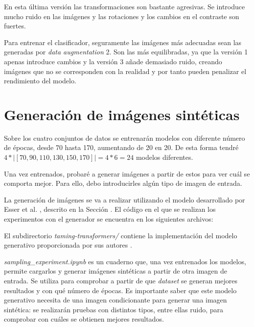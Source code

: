 En esta última versión las transformaciones son bastante agresivas. Se introduce mucho ruido en las imágenes y las rotaciones y los cambios en el contraste son fuertes.

Para entrenar el clasificador, seguramente las imágenes más adecuadas sean las generadas por \textit{data augmentation} 2. Son las más equilibradas, ya que la versión 1 apenas introduce cambios y la versión 3 añade demasiado ruido, creando imágenes que no se corresponden con la realidad y por tanto pueden penalizar el rendimiento del modelo.

\newpage
\section{Generación de imágenes sintéticas}

Sobre los cuatro conjuntos de datos se entrenarán modelos con diferente número de épocas, desde 70 hasta 170, aumentando de 20 en 20. De esta forma tendré $4 * |[70, 90, 110, 130, 150, 170]| = 4 * 6 = 24$ modelos diferentes.

Una vez entrenados, probaré a generar imágenes a partir de estos para ver cuál se comporta mejor. Para ello, debo introducirles algún tipo de imagen de entrada.

La generación de imágenes se va a realizar utilizando el modelo desarrollado por Esser et al. \cite{esser2021taming}, descrito en la Sección \label{st:taming-transformers}. El código en el que se realizan los experimentos con el generador se encuentra en los siguientes archivos:

\vspace{0.2cm}

\noindent El subdirectorio \textit{taming-transformers/} contiene la implementación del modelo generativo proporcionada por sus autores \cite{taming-transformers-github}. 

\noindent \textit{sampling\_experiment.ipynb} es un cuaderno que, una vez entrenados los modelos, permite cargarlos y generar imágenes sintéticas a partir de otra imagen de entrada. Se utiliza para comprobar a partir de que \textit{dataset} se generan mejores resultados y con qué número de épocas. Es importante saber que este modelo generativo necesita de una imagen condicionante para generar una imagen sintética: se realizarán pruebas con distintos tipos, entre ellas ruido, para comprobar con cuáles se obtienen mejores resultados.

